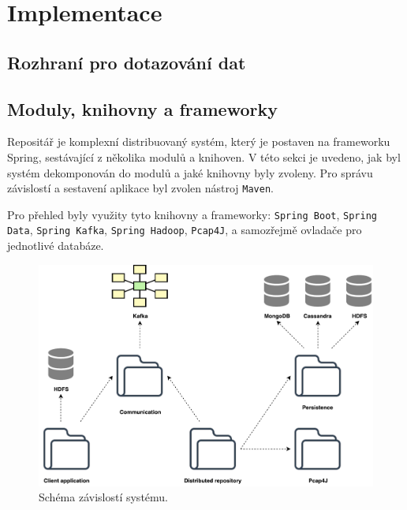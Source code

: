 \chapter{Implementace} \label{chapter_impl}

\section{Rozhraní pro dotazování dat}

\section{Moduly, knihovny a frameworky}
Repositář je komplexní distribuovaný systém, který je postaven na frameworku Spring, sestávající z několika modulů a knihoven. V této sekci je uvedeno, jak byl systém dekomponován do modulů a jaké knihovny byly zvoleny. Pro správu závislostí a sestavení aplikace byl zvolen nástroj \texttt{Maven}.

\vspace{0.5cm}

\noindent Pro přehled byly využity tyto knihovny a frameworky: \texttt{Spring Boot}, \texttt{Spring Data}, \texttt{Spring Kafka}, \texttt{Spring Hadoop}, \texttt{Pcap4J}, a samozřejmě ovladače pro jednotlivé databáze.

\begin{figure}[!h]
  \centering
  \includegraphics[width=15cm]{template-fig/Architecture.pdf}
  \caption{Schéma závislostí systému.}
  \label{FIG_Architecture}
\end{figure}

